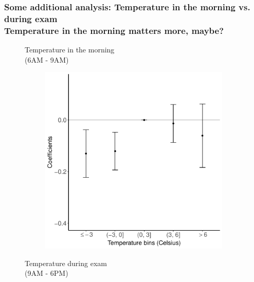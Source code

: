 \documentclass[10pt, pdfmx,hiresbb]{beamer}
\begin{document}
\begin{frame}\frametitle{{\normalsize Some additional analysis: Temperature in the morning vs. during exam} \\ {\small Temperature in the morning matters more, maybe?}}
  \begin{figure}
    \begin{minipage}{0.44\textwidth}
      \begin{center}
        Temperature in the morning \\ (6AM - 9AM)
      \end{center}
      \begin{figure}[h]
        \centering
        \includegraphics[width = \textwidth]{../Output/images/morning_exam_reg_6_morning.pdf}
      \end{figure}
    \end{minipage}
    \begin{minipage}{0.44\textwidth}
      \begin{center}
        Temperature during exam \\ (9AM - 6PM)
      \end{center}
      \begin{figure}[h]

\end{figure}
\end{minipage}
\end{figure}
\end{frame}
\end{document}
